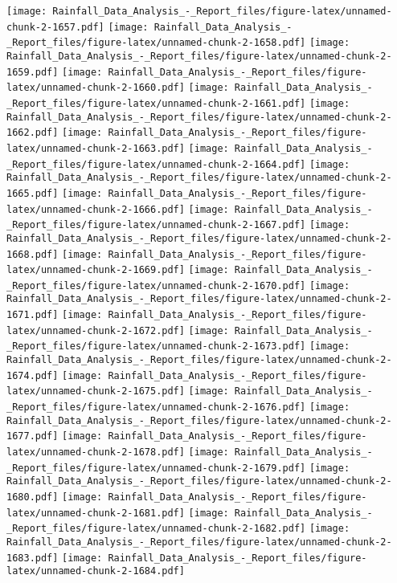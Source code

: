 \documentclass[
]{article}
\begin{document}
\texttt{[image: Rainfall\_Data\_Analysis\_-\_Report\_files/figure-latex/unnamed-chunk-2-1657.pdf]}
\texttt{[image: Rainfall\_Data\_Analysis\_-\_Report\_files/figure-latex/unnamed-chunk-2-1658.pdf]}
\texttt{[image: Rainfall\_Data\_Analysis\_-\_Report\_files/figure-latex/unnamed-chunk-2-1659.pdf]}
\texttt{[image: Rainfall\_Data\_Analysis\_-\_Report\_files/figure-latex/unnamed-chunk-2-1660.pdf]}
\texttt{[image: Rainfall\_Data\_Analysis\_-\_Report\_files/figure-latex/unnamed-chunk-2-1661.pdf]}
\texttt{[image: Rainfall\_Data\_Analysis\_-\_Report\_files/figure-latex/unnamed-chunk-2-1662.pdf]}
\texttt{[image: Rainfall\_Data\_Analysis\_-\_Report\_files/figure-latex/unnamed-chunk-2-1663.pdf]}
\texttt{[image: Rainfall\_Data\_Analysis\_-\_Report\_files/figure-latex/unnamed-chunk-2-1664.pdf]}
\texttt{[image: Rainfall\_Data\_Analysis\_-\_Report\_files/figure-latex/unnamed-chunk-2-1665.pdf]}
\texttt{[image: Rainfall\_Data\_Analysis\_-\_Report\_files/figure-latex/unnamed-chunk-2-1666.pdf]}
\texttt{[image: Rainfall\_Data\_Analysis\_-\_Report\_files/figure-latex/unnamed-chunk-2-1667.pdf]}
\texttt{[image: Rainfall\_Data\_Analysis\_-\_Report\_files/figure-latex/unnamed-chunk-2-1668.pdf]}
\texttt{[image: Rainfall\_Data\_Analysis\_-\_Report\_files/figure-latex/unnamed-chunk-2-1669.pdf]}
\texttt{[image: Rainfall\_Data\_Analysis\_-\_Report\_files/figure-latex/unnamed-chunk-2-1670.pdf]}
\texttt{[image: Rainfall\_Data\_Analysis\_-\_Report\_files/figure-latex/unnamed-chunk-2-1671.pdf]}
\texttt{[image: Rainfall\_Data\_Analysis\_-\_Report\_files/figure-latex/unnamed-chunk-2-1672.pdf]}
\texttt{[image: Rainfall\_Data\_Analysis\_-\_Report\_files/figure-latex/unnamed-chunk-2-1673.pdf]}
\texttt{[image: Rainfall\_Data\_Analysis\_-\_Report\_files/figure-latex/unnamed-chunk-2-1674.pdf]}
\texttt{[image: Rainfall\_Data\_Analysis\_-\_Report\_files/figure-latex/unnamed-chunk-2-1675.pdf]}
\texttt{[image: Rainfall\_Data\_Analysis\_-\_Report\_files/figure-latex/unnamed-chunk-2-1676.pdf]}
\texttt{[image: Rainfall\_Data\_Analysis\_-\_Report\_files/figure-latex/unnamed-chunk-2-1677.pdf]}
\texttt{[image: Rainfall\_Data\_Analysis\_-\_Report\_files/figure-latex/unnamed-chunk-2-1678.pdf]}
\texttt{[image: Rainfall\_Data\_Analysis\_-\_Report\_files/figure-latex/unnamed-chunk-2-1679.pdf]}
\texttt{[image: Rainfall\_Data\_Analysis\_-\_Report\_files/figure-latex/unnamed-chunk-2-1680.pdf]}
\texttt{[image: Rainfall\_Data\_Analysis\_-\_Report\_files/figure-latex/unnamed-chunk-2-1681.pdf]}
\texttt{[image: Rainfall\_Data\_Analysis\_-\_Report\_files/figure-latex/unnamed-chunk-2-1682.pdf]}
\texttt{[image: Rainfall\_Data\_Analysis\_-\_Report\_files/figure-latex/unnamed-chunk-2-1683.pdf]}
\texttt{[image: Rainfall\_Data\_Analysis\_-\_Report\_files/figure-latex/unnamed-chunk-2-1684.pdf]}
\end{document}
